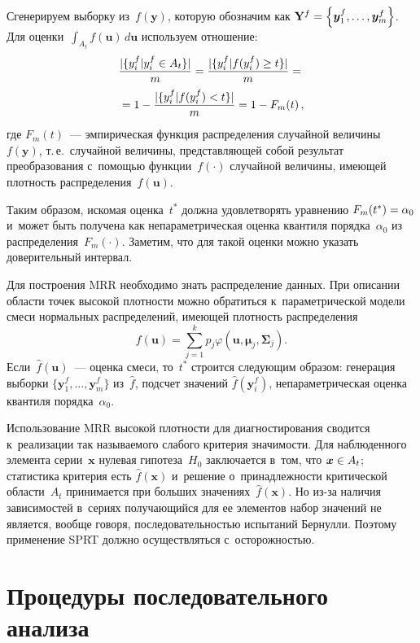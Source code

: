 \begin{multicols}{2}
     Сгенерируем выборку из~$f(\boldsymbol{y})$, которую обозначим как 
$\mathbf{Y}^f\hm= \left\{ \boldsymbol{y}_1^f, \ldots , 
\boldsymbol{y}_m^f\right\}$. Для оценки~$\int\nolimits_{A_t} 
f(\boldsymbol{u})\,d\boldsymbol{u}$
      используем отношение:
\begin{multline*}
\displaystyle\frac{\displaystyle \vert \{ y_i^f\vert y_i^f\in A_t\}\vert\mathstrut}{\displaystyle m\mathstrut}= \displaystyle\frac{\displaystyle \vert \{ y_i^f\vert 
f(y_i^f)\geq t\}\vert \mathstrut}{\displaystyle m\mathstrut}={}\\
{}=1-\displaystyle\frac{\displaystyle \vert \{ y_i^f\vert f(y_i^f)< t\}\vert \mathstrut}{\displaystyle m\mathstrut}=1-F_m(t)\,,
\end{multline*}
где $F_m(t)$~--- эмпирическая функция распределения случайной 
величины~$f(\boldsymbol{y})$, т.\,е.\ случайной величины, представляющей 
собой результат преобразования с~помощью функции~$f(\cdot)$ случайной 
величины, имеющей плотность распределения~$f(\boldsymbol{u})$.
     
     Таким образом, искомая оценка~$t^*$ должна удовле\-тво\-рять уравнению 
$F_m(t^*)\hm= \alpha_0$ и~может быть получена как непараметрическая 
оценка квантиля порядка~$\alpha_0$ из распределения~$F_m(\cdot)$. Заметим, 
что для такой оценки можно указать доверительный интервал.
     
     Для построения MRR необходимо знать распределение данных. При 
описании области точек высокой плотности можно обратиться 
к~параметрической модели смеси нормальных распределений, имеющей 
плотность распределения
     $$
     f(\boldsymbol{u})=\sum\limits^k_{j=1} 
p_j\varphi\left(\boldsymbol{u},\boldsymbol{\mu}_j, \boldsymbol{\Sigma}_j\right).
     $$ 
Если~$\hat{f}(\boldsymbol{u})$~--- оценка смеси, то~$t^*$ строится 
следующим образом: генерация выборки $\{ \boldsymbol{y}_1^f, \ldots , 
\boldsymbol{y}_m^f\}$ из~$\hat{f}$, подсчет значений 
$\hat{f}(\boldsymbol{y}_i^f)$, непараметрическая оценка квантиля 
порядка~$\alpha_0$.
     
     Использование MRR высокой плотности для диагностирования сводится 
к~реализации так называемого слабого критерия значимости. Для 
наблюденного элемента серии~$\boldsymbol{x}$ нулевая гипотеза~$H_0$ 
заключается в~том, что $\boldsymbol{x}\hm\in A_t$; статистика критерия есть 
$\hat{f}(\boldsymbol{x})$ и~решение о~принадлежности критической 
области~$A_t$ принимается при больших значениях~$\hat{f}(\boldsymbol{x})$. 
Но из-за наличия зависимостей в~сериях получающийся для ее элементов 
набор значений не является, вообще говоря, последовательностью испытаний 
Бернулли. Поэтому применение SPRT должно осуществляться 
с~осторожностью. 

\section{Процедуры последовательного анализа}


\end{multicols}
